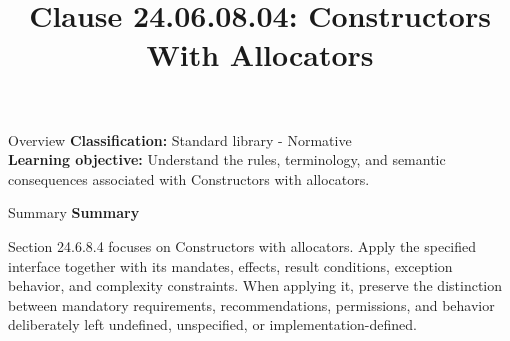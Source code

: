 \documentclass[10pt,letterpaper]{article}
\title{Clause 24.06.08.04: Constructors With Allocators}
\author{}
\date{}
\begin{document}
\maketitle
\begin{CornellOverviewBox}{Overview}
\textbf{Classification:} Standard library - Normative\\[2pt]
\textbf{Learning objective:} Understand the rules, terminology, and semantic consequences associated with Constructors with allocators.
\end{CornellOverviewBox}\begin{CornellSummaryBox}{Summary}
{\sffamily\bfseries\color{Accent} Summary}\par\vspace{3pt}Section 24.6.8.4 focuses on Constructors with allocators. Apply the specified interface together with its mandates, effects, result conditions, exception behavior, and complexity constraints. When applying it, preserve the distinction between mandatory requirements, recommendations, permissions, and behavior deliberately left undefined, unspecified, or implementation-defined.
\end{CornellSummaryBox}
\end{document}

